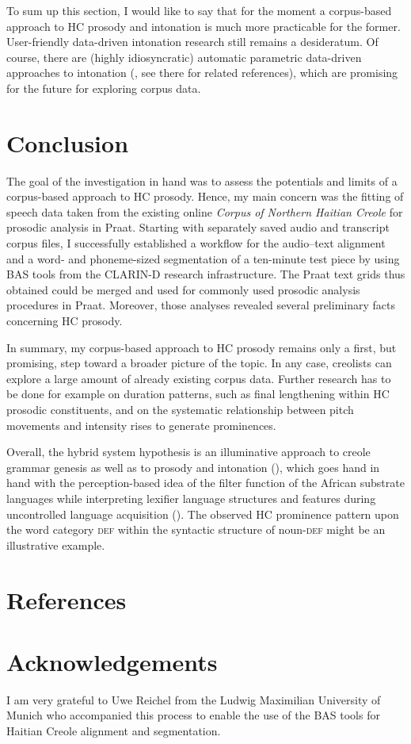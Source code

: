 \documentclass[output=paper]{langsci/langscibook}
\begin{document}
To sum up this section, I would like to say that for the moment a corpus-based approach to HC prosody and intonation is much more practicable for the former. User-friendly data-driven intonation research still remains a desideratum. Of course, there are (highly idiosyncratic) automatic parametric data-driven approaches to intonation (\citealt{Moehler1998,Taylor2000,Reichel2010,Reichel.2014}, see there for related references), which are promising for the future for exploring corpus data.

\section{\label{sec:kal:6}Conclusion}
The goal of the investigation in hand was to assess the potentials and limits of a corpus-based approach to HC prosody. Hence, my main concern was the fitting of speech data taken from the existing online \textit{Corpus of Northern Haitian Creole} for prosodic analysis in Praat. Starting with separately saved audio and transcript corpus files, I successfully established a workflow for the audio–text alignment and a word- and phoneme-sized segmentation of a ten-minute test piece by using BAS tools from the CLARIN-D research infrastructure. The Praat text grids thus obtained could be merged and used for commonly used prosodic analysis procedures in Praat. Moreover, those analyses revealed several preliminary facts concerning HC prosody.

In summary, my corpus-based approach to HC prosody remains only a first, but promising, step toward a broader picture of the topic. In any case, creolists can explore a large amount of already existing corpus data. Further research has to be done for example on duration patterns, such as final lengthening within HC prosodic constituents, and on the systematic relationship between pitch movements and intensity rises to generate prominences. 

Overall, the hybrid system hypothesis is an illuminative approach to creole grammar genesis \citep{Aboh2015} as well as to prosody and intonation (\citealt{Brousseau2003,Gooden2009}), which goes hand in hand with the perception-based idea of the filter function of the African substrate languages while interpreting lexifier language structures and features during uncontrolled language acquisition (\citealt{Hazael-Massieux1993}). The observed HC prominence pattern upon the word category \textsc{def} within the syntactic structure of noun-\textsc{def} might be an illustrative example.

\section{References}

\section*{Acknowledgements}

I am very grateful to Uwe Reichel from the Ludwig Maximilian University of Munich who accompanied this process to enable the use of the BAS tools for Haitian Creole alignment and segmentation.

{\sloppy
\printbibliography[heading=subbibliography,notkeyword=this]
}
\end{document}
